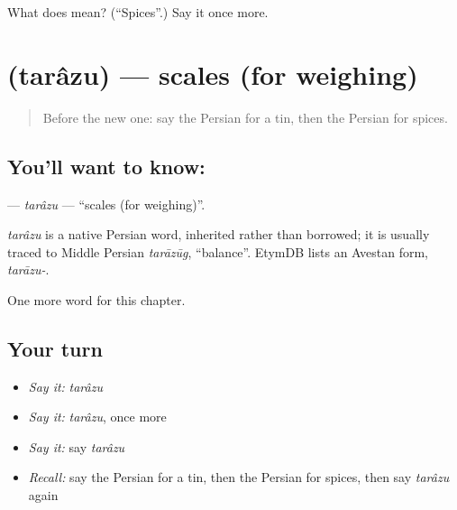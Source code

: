 \begin{tcolorbox}[breakable,colback=teal!4,colframe=teal!35!black,title={Before you move on}]
What does  mean? (\textquotedblleft{}Spices\textquotedblright{}.) Say it once more.
\end{tcolorbox}
\section[\texorpdfstring{\fa{ترازو} (tarâzu)}{ترازو (tarâzu)}]{ (tarâzu) — scales (for weighing)}

\label{lesson:FA-C247-tarazu}



\begin{quote}
Before the new one: say the Persian for a tin, then the Persian for spices.
\end{quote}

\subsection*{You'll want to know: }
\textbf{} — \emph{tarâzu} — \textquotedblleft{}scales (for weighing)\textquotedblright{}.

\begin{cousinweb}
\emph{tarâzu} is a native Persian word, inherited rather than borrowed; it is usually traced to Middle Persian \emph{tarāzūg}, \textquotedblleft{}balance\textquotedblright{}. EtymDB lists an Avestan form, \emph{tarāzu-}.
\end{cousinweb}

\begin{grammarlens}[title={What you've built}]
One more word for this chapter.
\end{grammarlens}

\subsection*{Your turn}
\begin{itemize}
\raggedright
  \item \emph{Say it:} \emph{tarâzu}
  \item \emph{Say it:} \emph{tarâzu}, once more
  \item \emph{Say it:} say \emph{tarâzu}
  \item \emph{Recall:} say the Persian for a tin, then the Persian for spices, then say \emph{tarâzu} again
\end{itemize}

